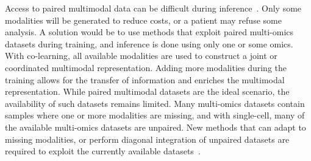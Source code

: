 \documentclass[../main.tex]{subfiles}
\begin{document}
	Access to paired multimodal data can be difficult during inference~\cite{Kang2021}.
	Only some modalities will be generated to reduce costs, or a patient may refuse some analysis.
	A solution would be to use methods that exploit paired multi-omics datasets during training, and inference is done using only one or some omics.
	With co-learning, all available modalities are used to construct a joint or coordinated multimodal representation.
	Adding more modalities during the training allows for the transfer of information and enriches the multimodal representation.
	While paired multimodal datasets are the ideal scenario, the availability of such datasets remains limited.
	Many multi-omics datasets contain samples where one or more modalities are missing, and with single-cell, many of the available multi-omics datasets are unpaired.
	New methods that can adapt to missing modalities, or perform diagonal integration of unpaired datasets are required to exploit the currently available datasets~\cite{Xu2022}.
\end{document}
